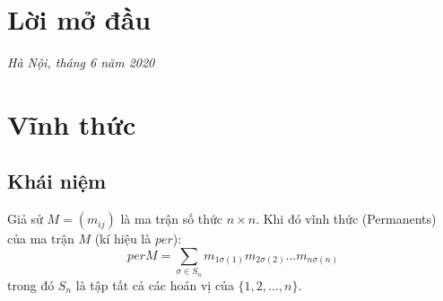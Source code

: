\documentclass[a4paper, 12pt]{report}
\begin{document}
\tableofcontents
\chapter*{Lời mở đầu}





\hspace*{7cm}\textit{Hà Nội, tháng 6 năm 2020}
	
\hspace*{8cm}
	
\hspace*{9cm}
\chapter{Vĩnh thức}
\section{Khái niệm}
Giả sử $M= (m_{ij})$ là ma trận số thức $n \times n$. Khi đó vĩnh thức (Permanents) của ma trận $M$ (kí hiệu là $per$):
\begin{equation*}
per M = \displaystyle \sum_{\sigma \in S_{n}}m_{1\sigma(1)}m_{2\sigma(2)}...m_{n\sigma(n)}
\end{equation*}
trong đó $S_{n}$ là tập tất cả các hoán vị của $\{1,2,...,n\}$.
\end{document}
